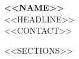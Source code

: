 \documentclass[10pt]{article}
\begin{document}
\begin{center}
  {\fontsize{22}{26}\selectfont\bfseries <<NAME>>}\\[4pt]
  {\small <<HEADLINE>>}\\[3pt]
  {\small <<CONTACT>>}
\end{center}

<<SECTIONS>>
\end{document}
